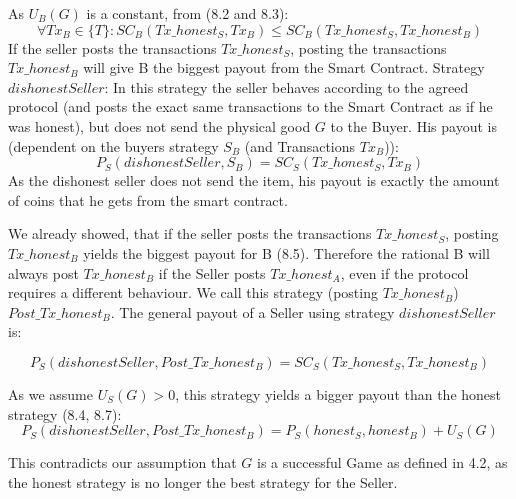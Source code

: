 \documentclass{cacthesis}
\begin{document}
As $U_B(G)$ is a constant, from (8.2 and 8.3):
\begin{equation}
    \forall Tx_B \in \{T\}: SC_B(Tx\_honest_S, Tx_B) \leq SC_B(Tx\_honest_S, Tx\_honest_B)
\end{equation}
If the seller posts the transactions $Tx\_honest_S$, posting the transactions $Tx\_honest_B$ will give B the biggest payout from the Smart Contract.
Strategy $dishonestSeller$: In this strategy the seller behaves according to the agreed protocol (and posts the exact same transactions to the Smart Contract as if he was honest), but does not send the physical good $G$ to the Buyer.\newline
His payout is (dependent on the buyers strategy $S_B$ (and Transactions $Tx_B$)):
\begin{equation}
    P_S(dishonestSeller,S_B) = SC_S(Tx\_honest_S,Tx_B)
\end{equation}
As the dishonest seller does not send the item, his payout is exactly the amount of coins that he gets from the smart contract.\newline

We already showed, that if the seller posts the transactions $Tx\_honest_S$, posting $Tx\_honest_B$ yields the biggest payout for B (8.5).\newline
Therefore the rational B will always post $Tx\_honest_B$ if the Seller posts $Tx\_honest_A$, even if the protocol requires a different behaviour. We call this strategy (posting $Tx\_honest_B$) $Post\_Tx\_honest_B$.\newline
The general payout of a Seller using strategy $dishonestSeller$ is:

\begin{equation}
    P_S(dishonestSeller,Post\_Tx\_honest_B) = SC_S(Tx\_honest_S,Tx\_honest_B)
\end{equation}

As we assume $U_S(G) > 0$, this strategy yields a bigger payout than the honest strategy (8.4, 8.7):
\[P_S(dishonestSeller,Post\_Tx\_honest_B) = P_S(honest_S,honest_B) + U_S(G)\]

This contradicts our assumption that $G$ is a successful Game as defined in 4.2, as the honest strategy is no longer the best strategy for the Seller.
	
	
	\appendix
\end{document}
